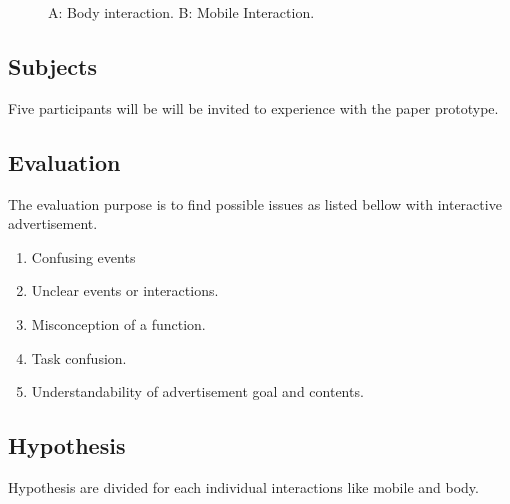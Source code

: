 \begin{figure}[H]
    \centering
    \hfill
    \caption{A: Body interaction.  B: Mobile Interaction. }%
    \label{fig:paper_prototype}%
\end{figure}



\subsection{Subjects}
Five participants will be will be invited to experience with the paper prototype.

\subsection{Evaluation}
The evaluation purpose is to find possible issues as listed bellow with interactive advertisement. 

\begin{enumerate}
\item	Confusing events
\item	Unclear events or interactions.
\item	Misconception of a function.
\item	Task confusion.
\item	Understandability of advertisement goal and contents.
\end{enumerate}


\subsection{Hypothesis}
Hypothesis are divided for each individual interactions like mobile and body.


